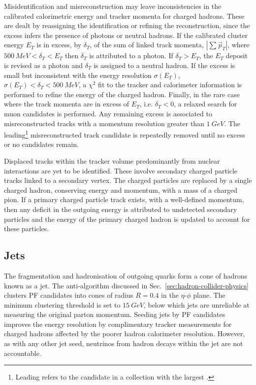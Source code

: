Misidentification and misreconstruction may leave inconsistencies in the calibrated calorimetric energy and tracker momenta for charged hadrons. These are dealt by reassigning the identification or refining the reconstruction, since the excess infers the presence of photons or neutral hadrons. If the calibrated cluster energy $E_T$ is in excess, by $\delta_T$, of the sum of linked track momenta, $|\sum \vec{p}_T|$, where ${\SI{500}{MeV}<\delta_T<E_T}$ then $\delta_T$ is attributed to a photon. If $\delta_T>E_T$, the $E_T$ deposit is revised as a photon and $\delta_T$ is assigned to a neutral hadron.  If the excess is small but inconsistent with the energy resolution $\sigma(E_T)$, ${\sigma(E_T)<\delta_T<\SI{500}{MeV}}$, a $\chi^2$ fit to the tracker and calorimeter information is performed to refine the energy of the charged hadron. Finally, in the rare case where the track momenta are in excess of $E_T$, i.e. $\delta_T<0$, a relaxed search for muon candidates is performed. Any remaining excess is associated to misreconstructed tracks with a momentum resolution greater than ${\SI{1}{GeV}}$. The leading\footnote{Leading refers to the candidate in a collection with the largest \pt.} misreconstructed track candidate is repeatedly removed until no excess or no candidates remain.

Displaced tracks within the tracker volume predominantly from nuclear interactions are yet to be identified. These involve secondary charged particle tracks linked to a secondary vertex. The charged particles are replaced by a single charged hadron, conserving energy and momentum, with a mass of a charged pion. If a primary charged particle track exists, with a well-defined momentum, then any deficit in the outgoing energy is attributed to undetected secondary particles and the energy of the primary charged hadron is updated to account for these particles.


\subsection{Jets}

The fragmentation and hadronisation of outgoing quarks form a cone of hadrons known as a jet. The anti-\kt algorithm \cite{Cacciari:2008gp,Cacciari2012} discussed in Sec.~\ref{sec:hadron-collider-physics} clusters PF candidates into cones of radius $R=0.4$ in the $\eta$-$\phi$ plane.  The minimum clustering threshold is set to $\SI{15}{GeV}$, below which jets are unreliable at measuring the original parton momentum. Seeding jets by PF candidates improves the energy resolution by complimentary tracker measurements for charged hadrons affected by the poorer hadron calorimeter resolution. However, as with any other jet seed, neutrinos from hadron decays within  the jet are not accountable.


